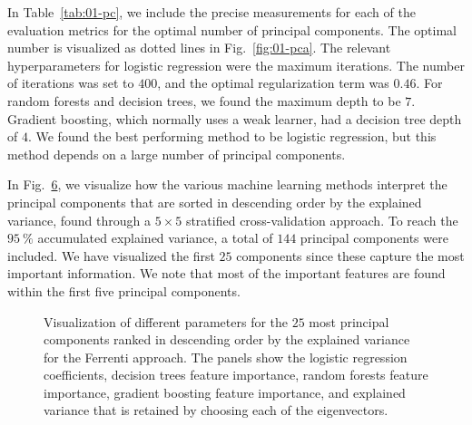 \documentclass[superscriptaddress,unsortedaddress,
 amsmath,amssymb,
 aps,
]{revtex4-2}
\begin{document}
In Table~\ref{tab:01-pc}, we include the precise measurements for each of the evaluation metrics for the optimal number of principal components. The optimal number is visualized as dotted lines in Fig.~\ref{fig:01-pca}. The relevant hyperparameters for logistic regression were the maximum iterations. The number of iterations was set to $400$, and the optimal regularization term was $0.46$. For random forests and decision trees, we found the maximum depth to be $7$. Gradient boosting, which normally uses a weak learner, had a decision tree depth of $4$. We found the best performing method to be logistic regression, but this method depends on a large number of principal components. 

In Fig.~\ref{fig:01-fi}, we visualize how the various machine learning methods  interpret the principal components that are sorted in descending order by the explained variance, found through a $5\times 5$ stratified cross-validation approach. To reach the $95 \ \%$ accumulated explained variance, a total of $144$ principal components were included. We have visualized the first $25$ components since these capture the most important information. We note that most of the important features are found within the first five principal components.

\begin{figure}[ht!]
  \begin{subfigure}[b]{0.5\textwidth}
    \centering
    
    \label{fig:01-fi-a}
  \end{subfigure}%

  \begin{subfigure}[b]{0.5\textwidth}
    \centering
    
    \label{fig:01-fi-b}
  \end{subfigure}%

  \begin{subfigure}[b]{0.5\textwidth}
    \centering
    
    \label{fig:01-fi-c}
  \end{subfigure}%

  \begin{subfigure}[b]{0.5\textwidth}
    \centering
    
    \label{fig:01-fi-d}
  \end{subfigure}%

  \begin{subfigure}[b]{0.5\textwidth}
    \centering
    
    \label{fig:01-fi-e}
  \end{subfigure}%

  \caption{Visualization of different parameters for the $25$ most principal components ranked in descending order by the explained variance for the Ferrenti approach. The panels show the logistic regression coefficients, decision trees feature importance, random forests feature importance, gradient boosting feature importance, and explained variance that is retained by choosing each of the eigenvectors. }
  \label{fig:01-fi}
\end{figure}
\end{document}
